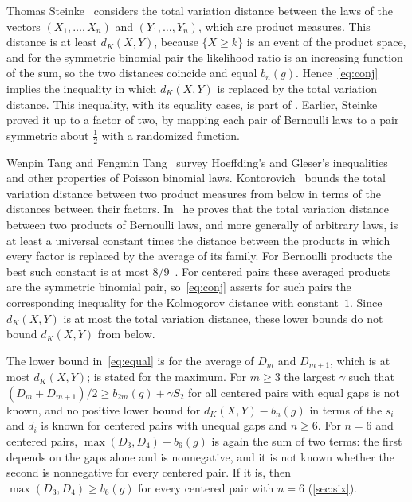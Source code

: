 \documentclass[11pt,a4paper]{article}
\numberwithin{equation}{section}
\theoremstyle{remark}
\begin{document}
Thomas Steinke~\cite{Steinke} considers the total variation distance between the laws of the vectors $(X_1,\dots,X_n)$ and $(Y_1,\dots,Y_n)$, which are product measures. This distance is at least $d_K(X,Y)$, because $\{X\ge k\}$ is an event of the product space, and for the symmetric binomial pair the likelihood ratio is an increasing function of the sum, so the two distances coincide and equal $b_n(g)$. Hence~\eqref{eq:conj} implies the inequality in which $d_K(X,Y)$ is replaced by the total variation distance. This inequality, with its equality cases, is part of \cite[Theorem~1.1]{Long}. Earlier, Steinke proved it up to a factor of two, by mapping each pair of Bernoulli laws to a pair symmetric about $\frac12$ with a randomized function.

Wenpin Tang and Fengmin Tang~\cite{TangTang} survey Hoeffding's and Gleser's inequalities and other properties of Poisson binomial laws. Kontorovich~\cite{KontorovichTens} bounds the total variation distance between two product measures from below in terms of the distances between their factors. In~\cite{KontorovichHom,KontorovichTV} he proves that the total variation distance between two products of Bernoulli laws, and more generally of arbitrary laws, is at least a universal constant times the distance between the products in which every factor is replaced by the average of its family. For Bernoulli products the best such constant is at most $8/9$~\cite[remark after Theorem~1.5]{KontorovichTV}. For centered pairs these averaged products are the symmetric binomial pair, so~\eqref{eq:conj} asserts for such pairs the corresponding inequality for the Kolmogorov distance with constant~$1$. Since $d_K(X,Y)$ is at most the total variation distance, these lower bounds do not bound $d_K(X,Y)$ from below.

The lower bound in~\eqref{eq:equal} is for the average of $D_m$ and $D_{m+1}$, which is at most $d_K(X,Y)$; \cite[Theorem~1.1]{Long} is stated for the maximum. For $m\ge3$ the largest $\gamma$ such that $(D_m+D_{m+1})/2\ge b_{2m}(g)+\gamma S_2$ for all centered pairs with equal gaps is not known, and no positive lower bound for $d_K(X,Y)-b_n(g)$ in terms of the $s_i$ and $d_i$ is known for centered pairs with unequal gaps and $n\ge6$. For $n=6$ and centered pairs, $\max(D_3,D_4)-b_6(g)$ is again the sum of two terms: the first depends on the gaps alone and is nonnegative, and it is not known whether the second is nonnegative for every centered pair. If it is, then $\max(D_3,D_4)\ge b_6(g)$ for every centered pair with $n=6$ (\cref{sec:six}).
\end{document}
